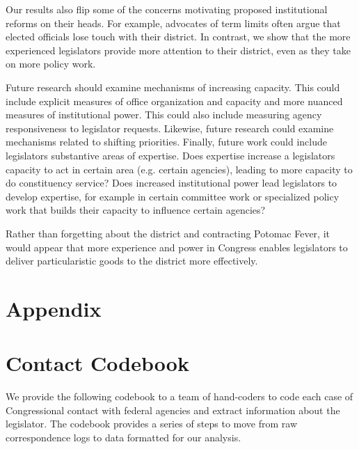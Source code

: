 \documentclass[12pt]{article}
\begin{document}
Our results also flip some of the concerns motivating proposed institutional reforms on their heads. For example, advocates of term limits often argue that elected officials lose touch with their district. In contrast, we show that the more experienced legislators provide more attention to their district, even as they take on more policy work. 

Future research should examine mechanisms of increasing capacity. This could include explicit measures of office organization and capacity and more nuanced measures of institutional power. This could also include measuring agency responsiveness to legislator requests. Likewise, future research could examine mechanisms related to shifting priorities. Finally, future work could include legislators substantive areas of expertise. Does expertise increase a legislators capacity to act in certain area (e.g. certain agencies), leading to more capacity to do constituency service? Does increased institutional power lead legislators to develop expertise, for example in certain committee work or specialized policy work that builds their capacity to influence certain agencies? 


Rather than forgetting about the district and contracting Potomac Fever, it would appear that more experience and power in Congress enables legislators to deliver particularistic goods to the district more effectively.  





\clearpage
\appendix
\setcounter{table}{0}
\renewcommand{\thetable}{A\arabic{table}}

\section*{Appendix}




\section{Contact Codebook} \label{a:codebook}
\singlespacing

We provide the following codebook to a team of hand-coders to code each case of Congressional contact with federal agencies and extract information about the legislator. The codebook provides a series of steps to move from raw correspondence logs to data formatted for our analysis.  
\end{document}
